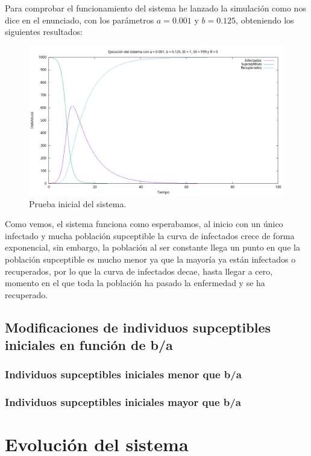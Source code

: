 \documentclass[12pt, spanish]{article}
\begin{document}
Para comprobar el funcionamiento del sistema he lanzado la simulación como nos dice en el enunciado, con los parámetros $a = 0.001$ y $b = 0.125$, obteniendo los siguientes resultados:

\begin{figure}[H]
  \centering
      \includegraphics[width=\textwidth]{SIR_prueba_basica.png}
 		\caption{Prueba inicial del sistema.}
\end{figure}

Como vemos, el sistema funciona como esperabamos, al inicio con un único infectado y mucha población supceptible la curva de infectados crece de forma exponencial, sin embargo, la población al ser constante llega un punto en que la población supceptible es mucho menor ya que la mayoría ya están infectados o recuperados, por lo que la curva de infectados decae, hasta llegar a cero, momento en el que toda la población ha pasado la enfermedad y se ha recuperado.

\subsection{Modificaciones de individuos supceptibles iniciales en función de b/a}

\subsubsection{Individuos supceptibles iniciales menor que b/a}


\subsubsection{Individuos supceptibles iniciales mayor que b/a}



\section{Evolución del sistema}
\end{document}
